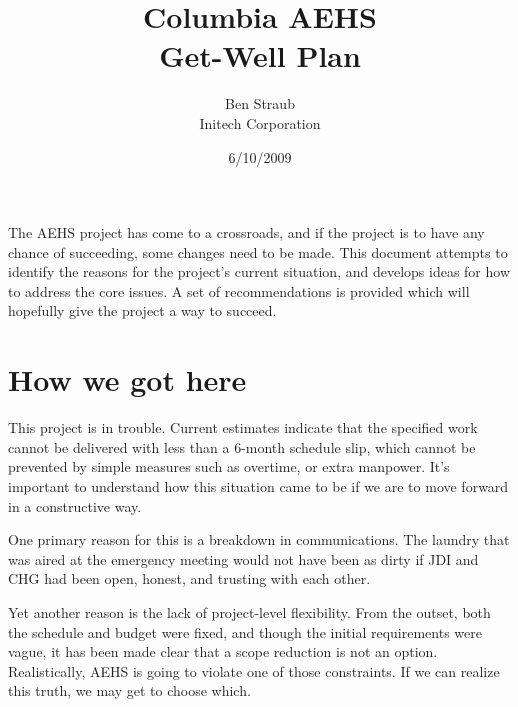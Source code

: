 \documentclass[11pt]{article}
\begin{document}

\title{Columbia AEHS\\Get-Well Plan}
\author{Ben Straub\\Initech Corporation}
\date{6/10/2009}
\maketitle
\thispagestyle{empty}



\vskip 1in

The AEHS project has come to a crossroads, and if the project is to have any chance of succeeding,
some changes need to be made.  This document attempts to identify the reasons for the project's
current situation, and develops ideas for how to address the core issues.  A set of recommendations
is provided which will hopefully give the project a way to succeed.

\clearpage

\tableofcontents
\clearpage


\section{How we got here}

\todo[inline]{\ldots}

This project is in trouble.  Current estimates indicate that the specified work cannot be delivered
with less than a 6-month schedule slip, which cannot be prevented by simple measures such as
overtime, or extra manpower.  It's important to understand how this situation came to be if we are
to move forward in a constructive way.

One primary reason for this is a breakdown in communications.  The laundry that was aired at the
emergency meeting would not have been as dirty if JDI and CHG had been open, honest, and trusting
with each other.

Yet another reason is the lack of project-level flexibility.  From the outset, both the schedule and
budget were fixed, and though the initial requirements were vague, it has been made clear that a
scope reduction is not an option.  Realistically, AEHS is going to violate one of those constraints.
If we can realize this truth, we may get to choose which.  
\end{document}
